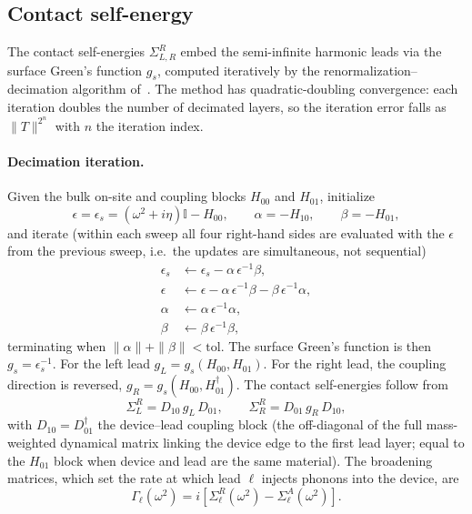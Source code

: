 \subsection{Contact self-energy}
\label{sub:contact_se}

The contact self-energies $\Sigma^R_{L,R}$ embed the semi-infinite
harmonic leads via the surface Green's function $g_s$, computed
iteratively by the renormalization--decimation algorithm of~\citet{sancho_highly_1985}.
The method has quadratic-doubling convergence: each iteration
doubles the number of decimated layers, so the iteration error
falls as $\|T\|^{2^n}$ with $n$ the iteration index.

\paragraph{Decimation iteration.}
Given the bulk on-site and coupling blocks $H_{00}$ and $H_{01}$,
initialize
\begin{equation}
  \epsilon = \epsilon_s = (\omega^2 + i\eta)\mathbb{I} - H_{00},
  \qquad
  \alpha = -H_{10},
  \qquad
  \beta  = -H_{01},
\end{equation}
and iterate (within each sweep all four right-hand sides are evaluated with the
$\epsilon$ from the previous sweep, i.e.\ the updates are simultaneous, not
sequential)
\begin{align}
  \epsilon_s &\leftarrow \epsilon_s - \alpha\,\epsilon^{-1}\beta, \label{eq:sr_eps_s}\\
  \epsilon   &\leftarrow \epsilon - \alpha\,\epsilon^{-1}\beta
              - \beta\,\epsilon^{-1}\alpha, \label{eq:sr_eps}\\
  \alpha     &\leftarrow \alpha\,\epsilon^{-1}\alpha, \label{eq:sr_alpha}\\
  \beta      &\leftarrow \beta\,\epsilon^{-1}\beta, \label{eq:sr_beta}
\end{align}
terminating when $\|\alpha\|+\|\beta\|<\mathrm{tol}$. The surface
Green's function is then $g_s = \epsilon_s^{-1}$. For the left lead
$g_L = g_s(H_{00},H_{01})$. For the right lead, the coupling direction
is reversed, $g_R = g_s(H_{00},H_{01}^\dagger)$. The contact
self-energies follow from
\begin{equation}\label{eq:sigma_lr}
  \Sigma_L^R = D_{10}\,g_L\,D_{01},
  \qquad
  \Sigma_R^R = D_{01}\,g_R\,D_{10},
\end{equation}
with $D_{10}=D_{01}^\dagger$ the device--lead coupling block (the off-diagonal of
the full mass-weighted dynamical matrix linking the device edge to the first lead
layer; equal to the $H_{01}$ block when device and lead are the same material).
The broadening matrices, which set the rate at which lead $\ell$
injects phonons into the device, are
\begin{equation}\label{eq:gamma_def}
  \Gamma_\ell(\omega^2) = i[\Sigma_\ell^R(\omega^2) - \Sigma_\ell^A(\omega^2)].
\end{equation}

